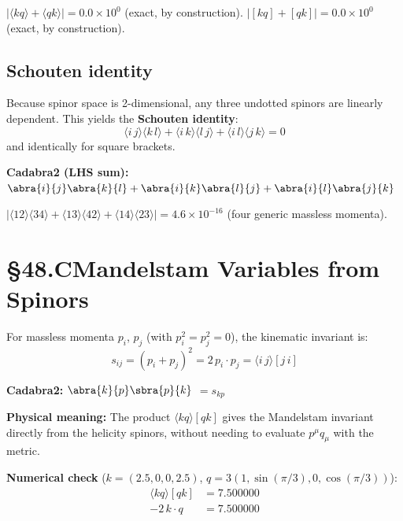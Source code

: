 \documentclass[12pt]{article}
\newcommand{\cdbexpr}[1]{\textcolor{cadblue}{$#1$}}
\newcommand{\verified}[1]{\textcolor{verifygreen}{\checkmark\; #1}}
\begin{document}
\verified{$|\langle kq\rangle + \langle qk\rangle| = 0.0\times10^0$ (exact, by construction).}
\verified{$|[kq] + [qk]| = 0.0\times10^0$ (exact, by construction).}

\subsection{Schouten identity}

Because spinor space is 2-dimensional, any three undotted spinors are linearly
dependent.  This yields the \textbf{Schouten identity}:
\begin{equation}
  \boxed{
    \langle i\,j\rangle\langle k\,l\rangle
    + \langle i\,k\rangle\langle l\,j\rangle
    + \langle i\,l\rangle\langle j\,k\rangle = 0
  }
  \tag{48.7}
\end{equation}
and identically for square brackets.

\textbf{Cadabra2 (LHS sum):} \cdbexpr{\abra{i}{j}\abra{k}{l} + \abra{i}{k}\abra{l}{j} + \abra{i}{l}\abra{j}{k}}

\verified{$|\langle12\rangle\langle34\rangle + \langle13\rangle\langle42\rangle + \langle14\rangle\langle23\rangle| = 4.6\times10^{-16}$ (four generic massless momenta).}

\section{§48.C\quad Mandelstam Variables from Spinors}

For massless momenta $p_i$, $p_j$ (with $p_i^2=p_j^2=0$), the kinematic invariant is:
\begin{equation}
  \boxed{
    s_{ij} = (p_i+p_j)^2 = 2\,p_i\cdot p_j = \langle i\,j\rangle[j\,i]
  }
  \tag{48.8}
\end{equation}

\textbf{Cadabra2:} \cdbexpr{\abra{k}{p}\sbra{p}{k}} $= s_{kp}$

\medskip
\textbf{Physical meaning:} The product $\langle kq\rangle[qk]$ gives the
Mandelstam invariant directly from the helicity spinors, without needing to
evaluate $p^\mu q_\mu$ with the metric.

\textbf{Numerical check} ($k=(2.5,0,0,2.5)$, $q=3(1,\sin(\pi/3),0,\cos(\pi/3))$):
\begin{align*}
  \langle kq\rangle[qk] &= 7.500000 \\
  -2\,k\cdot q &= 7.500000
\end{align*}
\end{document}

